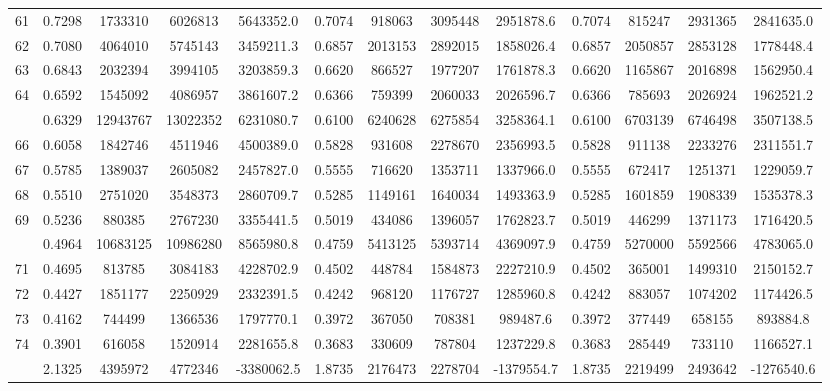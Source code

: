 \documentclass[
  12pt,
]{article}
\begin{document}
\begin{longtable}[t]{lcccccccccccc}
61 & 0.7298 & 1733310 & 6026813 & 5643352.0 & 0.7074 & 918063 & 3095448 & 2951878.6 & 0.7074 & 815247 & 2931365 & 2841635.0\\
62 & 0.7080 & 4064010 & 5745143 & 3459211.3 & 0.6857 & 2013153 & 2892015 & 1858026.4 & 0.6857 & 2050857 & 2853128 & 1778448.4\\
63 & 0.6843 & 2032394 & 3994105 & 3203859.3 & 0.6620 & 866527 & 1977207 & 1761878.3 & 0.6620 & 1165867 & 2016898 & 1562950.4\\
64 & 0.6592 & 1545092 & 4086957 & 3861607.2 & 0.6366 & 759399 & 2060033 & 2026596.7 & 0.6366 & 785693 & 2026924 & 1962521.2\\
\addlinespace
65 & 0.6329 & 12943767 & 13022352 & 6231080.7 & 0.6100 & 6240628 & 6275854 & 3258364.1 & 0.6100 & 6703139 & 6746498 & 3507138.5\\
66 & 0.6058 & 1842746 & 4511946 & 4500389.0 & 0.5828 & 931608 & 2278670 & 2356993.5 & 0.5828 & 911138 & 2233276 & 2311551.7\\
67 & 0.5785 & 1389037 & 2605082 & 2457827.0 & 0.5555 & 716620 & 1353711 & 1337966.0 & 0.5555 & 672417 & 1251371 & 1229059.7\\
68 & 0.5510 & 2751020 & 3548373 & 2860709.7 & 0.5285 & 1149161 & 1640034 & 1493363.9 & 0.5285 & 1601859 & 1908339 & 1535378.3\\
69 & 0.5236 & 880385 & 2767230 & 3355441.5 & 0.5019 & 434086 & 1396057 & 1762823.7 & 0.5019 & 446299 & 1371173 & 1716420.5\\
\addlinespace
70 & 0.4964 & 10683125 & 10986280 & 8565980.8 & 0.4759 & 5413125 & 5393714 & 4369097.9 & 0.4759 & 5270000 & 5592566 & 4783065.0\\
71 & 0.4695 & 813785 & 3084183 & 4228702.9 & 0.4502 & 448784 & 1584873 & 2227210.9 & 0.4502 & 365001 & 1499310 & 2150152.7\\
72 & 0.4427 & 1851177 & 2250929 & 2332391.5 & 0.4242 & 968120 & 1176727 & 1285960.8 & 0.4242 & 883057 & 1074202 & 1174426.5\\
73 & 0.4162 & 744499 & 1366536 & 1797770.1 & 0.3972 & 367050 & 708381 & 989487.6 & 0.3972 & 377449 & 658155 & 893884.8\\
74 & 0.3901 & 616058 & 1520914 & 2281655.8 & 0.3683 & 330609 & 787804 & 1237229.8 & 0.3683 & 285449 & 733110 & 1166527.1\\
\addlinespace
75 & 2.1325 & 4395972 & 4772346 & -3380062.5 & 1.8735 & 2176473 & 2278704 & -1379554.7 & 1.8735 & 2219499 & 2493642 & -1276540.6\\*
\end{longtable}
\endgroup{}
\end{document}
